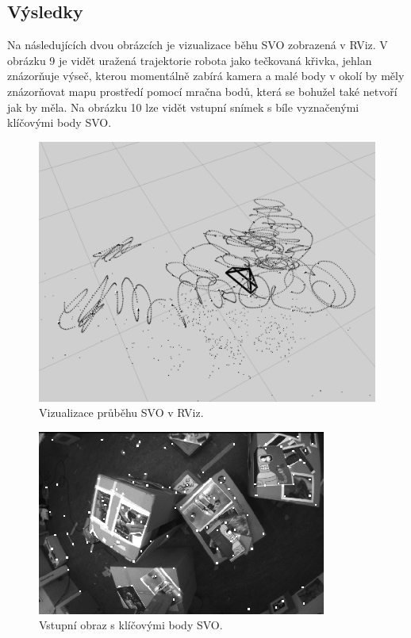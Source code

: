 \documentclass[12pt,a4paper]{report}
\begin{document}
\subsection*{Výsledky} 
Na následujících dvou obrázcích je vizualizace běhu SVO zobrazená v RViz. V obrázku 9 je vidět uražená trajektorie robota jako tečkovaná křivka, jehlan znázorňuje výseč, kterou momentálně zabírá kamera a malé body v okolí by měly znázorňovat mapu prostředí pomocí mračna bodů, která se bohužel také netvoří jak by měla. Na obrázku 10 lze vidět vstupní snímek s bíle vyznačenými klíčovými body SVO.
 
\begin{figure}[H]
\centering
\includegraphics[scale=0.5]{img/SVO_rviz_1.png}
\caption{Vizualizace průběhu SVO v RViz.}
\end{figure}

\begin{figure}[H]
\centering
\includegraphics[scale=1]{img/SVO_rviz_2.png}
\caption{Vstupní obraz s klíčovými body SVO.}
\end{figure}
\end{document}
